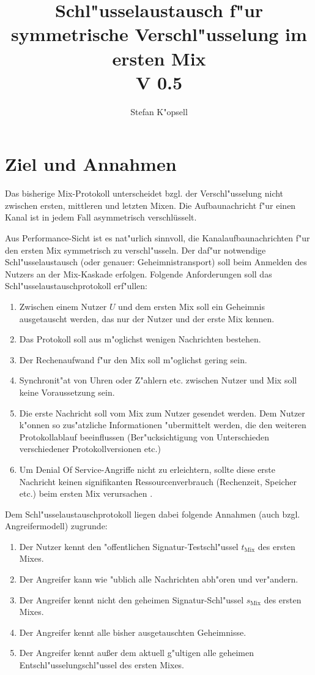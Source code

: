 \documentclass[a4paper,german]{article}
\begin{document}
\title{Schl"usselaustausch f"ur symmetrische Verschl"usselung im ersten Mix\\V 0.5}
\author{Stefan K"opsell}
\maketitle
\section{Ziel und Annahmen}
Das bisherige Mix-Protokoll unterscheidet bzgl. der Verschl"usselung nicht zwischen ersten, mittleren und letzten Mixen. Die Aufbaunachricht
f"ur einen Kanal ist in jedem Fall asymmetrisch verschl\"usselt.

Aus Performance-Sicht ist es nat"urlich sinnvoll, die Kanalaufbaunachrichten 
f"ur den ersten Mix symmetrisch zu verschl"usseln. Der daf"ur notwendige Schl"ussel\-austausch (oder genauer: Geheimnistransport) soll beim Anmelden des Nutzers an der Mix-Kaskade erfolgen.
Folgende Anforderungen soll das Schl"ussel\-austauschprotokoll erf"ullen:
\begin{enumerate}
\item Zwischen einem Nutzer $U$ und dem ersten Mix soll ein Geheimnis ausgetauscht werden, das nur der Nutzer und der erste
Mix kennen.
\item Das Protokoll soll aus m"oglichst wenigen Nachrichten bestehen.
\item Der Rechenaufwand f"ur den Mix soll m"oglichst gering sein.
\item Synchronit"at von Uhren oder Z"ahlern etc. zwischen Nutzer und Mix soll keine Voraussetzung sein.
\item Die erste Nachricht soll vom Mix zum Nutzer gesendet werden. Dem Nutzer k"onnen so zus"atzliche Informationen "ubermittelt werden,
die den weiteren Protokollablauf beeinflussen (Ber"ucksichtigung von Unterschieden verschiedener Protokollversionen etc.)
\item\label{z1} Um \glqq Denial Of Service\grqq-Angriffe nicht zu erleichtern, sollte diese erste Nachricht keinen signifikanten Ressourcenverbrauch 
(Rechenzeit, Speicher etc.) beim ersten Mix verursachen .
\end{enumerate}

\noindent
Dem Schl"usselaustauschprotokoll liegen dabei folgende Annahmen (auch bzgl. Angreifermodell) zugrunde:
\begin{enumerate}
\item Der Nutzer kennt den "offentlichen Signatur-Testschl"ussel $t_\text{Mix}$ des ersten Mixes.
\item Der Angreifer kann wie "ublich alle Nachrichten abh"oren und ver"andern.
\item Der Angreifer kennt nicht den geheimen Signatur-Schl"ussel $s_\text{Mix}$ des ersten Mixes.
\item Der Angreifer kennt alle bisher ausgetauschten Geheimnisse.
\item \label{a1} Der Angreifer kennt au{\ss}er dem aktuell g"ultigen alle geheimen Entschl"usselungschl"ussel des ersten Mixes.
\end{enumerate}
\end{document}
